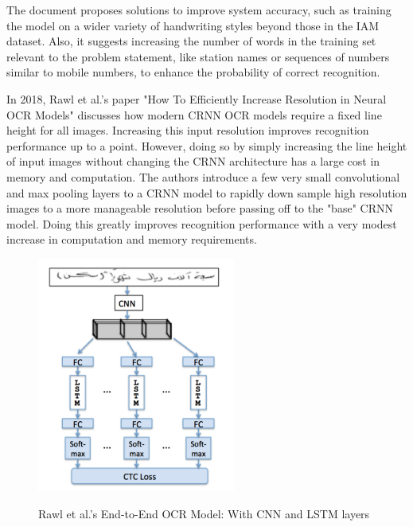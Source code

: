 The document proposes solutions to improve system accuracy, such as training the model on a wider variety of handwriting styles beyond those in the IAM dataset. Also, it suggests increasing the number of words in the training set relevant to the problem statement, like station names or sequences of numbers similar to mobile numbers, to enhance the probability of correct recognition.\cite{shindeUsingCRNNPerform2021}


In 2018, Rawl et al.'s paper "How To Efficiently Increase Resolution in Neural OCR Models" discusses how modern CRNN OCR models require a fixed line height for all images. Increasing this input resolution improves recognition performance up to a point. However, doing so by simply increasing the line height of input images without changing the CRNN architecture has a large cost in memory and computation. The authors introduce a few very small convolutional and max pooling layers to a CRNN model to rapidly down sample high resolution images to a more manageable resolution before passing off to the "base" CRNN model. Doing this greatly improves recognition performance with a very modest increase in computation and memory requirements.

\begin{figure}[ht]
    \centering
    \includegraphics[width=0.58\textwidth]{Figures/CRNN_Papers/Rawl_2018.jpg}
    \caption[Rawl et al.'s End-to-End OCR Model: With CNN and LSTM layers]{Rawl et al.'s End-to-End OCR Model: With CNN and LSTM layers}\cite{rawlsHowEfficientlyIncrease2018}
    \label{fig:Rawl et al.'s End-to-End OCR Model: With CNN and LSTM layers}
\end{figure}


